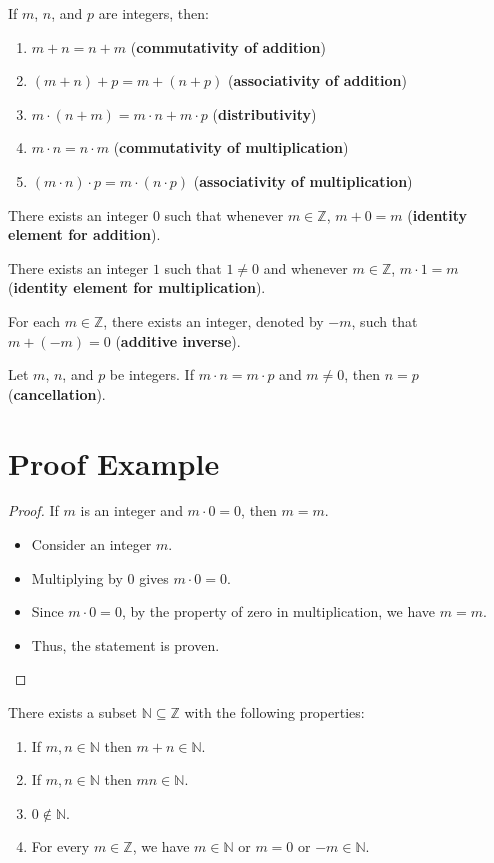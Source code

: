 If $m$, $n$, and $p$ are integers, then:
\begin{enumerate}[label=(\roman*)]
    \item $m+n = n+m$ \hfill (\textbf{commutativity of addition})
    \item $(m+n)+ p = m+(n+ p)$ \hfill (\textbf{associativity of addition})
    \item $m\cdot (n+m) = m\cdot n+m\cdot p$ \hfill (\textbf{distributivity})
    \item $m\cdot n = n\cdot m$ \hfill (\textbf{commutativity of multiplication})
    \item $(m\cdot n) \cdot p = m\cdot (n\cdot p)$ \hfill (\textbf{associativity of multiplication})
\end{enumerate}

There exists an integer $0$ such that whenever $m \in \mathbb{Z}$, $m+0 = m$ (\textbf{identity element for addition}).

There exists an integer $1$ such that $1 \neq 0$ and whenever $m \in \mathbb{Z}$, $m\cdot 1 = m$ (\textbf{identity element for multiplication}).

For each $m \in \mathbb{Z}$, there exists an integer, denoted by $-m$, such that $m+(-m) = 0$ (\textbf{additive inverse}).

Let $m$, $n$, and $p$ be integers. If $m\cdot n = m\cdot p$ and $m \neq 0$, then $n = p$ (\textbf{cancellation}).

\section*{Proof Example}
\begin{proof}
  If \(m\) is an integer and \(m \cdot 0 = 0\), then \(m = m\).
  \begin{itemize}
    \item Consider an integer \(m\).
    \item Multiplying by \(0\) gives \(m \cdot 0 = 0\).
    \item Since \(m \cdot 0 = 0\), by the property of zero in multiplication, we have \(m = m\).
    \item Thus, the statement is proven.\qedhere
  \end{itemize}
\end{proof}

There exists a subset $\mathbb{N} \subseteq \mathbb{Z}$ with the following properties:
\begin{enumerate}[label=(\roman*)]
    \item If $m,n \in \mathbb{N}$ then $m+n \in \mathbb{N}$.
    \item If $m,n \in \mathbb{N}$ then $mn \in \mathbb{N}$.
    \item $0 \notin \mathbb{N}$.
    \item For every $m \in \mathbb{Z}$, we have $m \in \mathbb{N}$ or $m = 0$ or $-m \in \mathbb{N}$.
\end{enumerate}